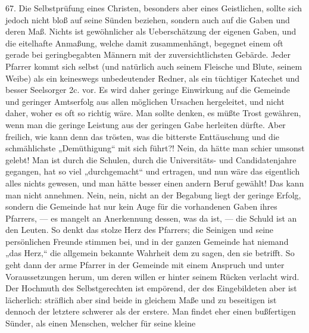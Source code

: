 67. Die Selbstprüfung eines Christen, besonders aber eines Geistlichen, sollte sich jedoch nicht bloß auf seine Sünden beziehen, sondern auch auf die Gaben und deren Maß. Nichts ist gewöhnlicher als Ueberschätzung der eigenen Gaben, und die eitelhafte Anmaßung, welche damit zusammenhängt, begegnet einem oft gerade bei geringbegabten Männern mit der zuversichtlichsten Gebärde. Jeder Pfarrer kommt sich selbst (und natürlich auch seinem Fleische und Blute, seinem Weibe) als ein keineswegs unbedeutender Redner, als ein tüchtiger Katechet und
besser Seelsorger 2c. vor. Es wird daher geringe Einwirkung auf die Gemeinde und geringer Amtserfolg aus allen möglichen Ursachen hergeleitet, und nicht daher, woher es oft so richtig wäre. Man sollte denken, es müßte Trost gewähren, wenn man die geringe Leistung aus der geringen Gabe herleiten dürfte. Aber freilich, wie kann denn das trösten, was die bitterste Enttäuschung und die schmählichste „Demüthigung“ mit sich führt?! Nein, da hätte man schier umsonst gelebt! Man ist durch die Schulen, durch die Universitäts- und Candidatenjahre gegangen, hat so viel „durchgemacht“ und ertragen, und nun wäre das eigentlich alles nichts gewesen, und man hätte besser einen andern Beruf gewählt! Das kann man nicht annehmen. Nein, nein, nicht an der Begabung liegt der geringe Erfolg, sondern die Gemeinde hat nur kein Auge für die vorhandenen Gaben ihres Pfarrers, — es mangelt an Anerkennung dessen, was da ist, — die Schuld ist an den Leuten. So denkt das stolze Herz des Pfarrers; die Seinigen und seine persönlichen Freunde stimmen bei, und in der ganzen Gemeinde hat niemand „das Herz,“ die allgemein bekannte Wahrheit dem zu sagen, den sie betrifft. So geht dann der arme Pfarrer in der Gemeinde mit einem Anspruch und unter Voraussetzungen herum, um deren willen er hinter seinem Rücken verlacht wird. Der Hochmuth des Selbstgerechten ist empörend, der des Eingebildeten aber ist lächerlich: sträflich aber sind beide in gleichem Maße und zu beseitigen ist dennoch der letztere schwerer als der erstere. Man findet eher einen bußfertigen Sünder, als einen Menschen, welcher für seine kleine
